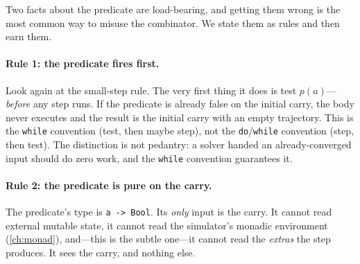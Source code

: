 Two facts about the predicate are load-bearing, and getting them wrong is the
most common way to misuse the combinator. We state them as rules and then earn
them.

\paragraph{Rule 1: the predicate fires first.} Look again at the small-step
rule. The very first thing it does is test $p(a)$---\emph{before} any step runs.
If the predicate is already false on the initial carry, the body never executes
and the result is the initial carry with an empty trajectory. This is the
\texttt{while} convention (test, then maybe step), not the
\texttt{do}/\texttt{while} convention (step, then test). The distinction is not
pedantry: a solver handed an already-converged input should do zero work, and the
\texttt{while} convention guarantees it.

\paragraph{Rule 2: the predicate is pure on the carry.} The predicate's type is
\lstinline[style=l4style]|a -> Bool|. Its \emph{only} input is the carry. It
cannot read external mutable state, it cannot read the simulator's monadic
environment (\cref{ch:monad}), and---this is the subtle one---it cannot read the
\emph{extras} the step produces. It sees the carry, and nothing else.

